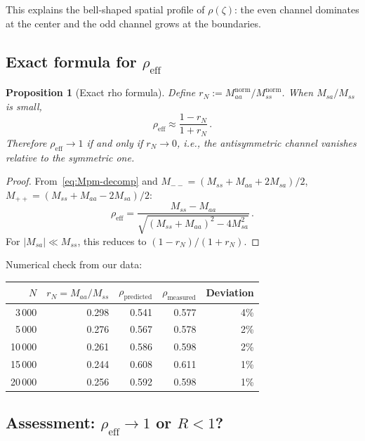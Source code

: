 \documentclass[11pt,a4paper]{article}
\newtheorem{proposition}{Proposition}
\begin{document}
This explains the bell-shaped spatial profile of $\rho(\zeta)$:
the even channel dominates at the center and the odd channel grows
at the boundaries.

\subsection{Exact formula for $\rho_{\mathrm{eff}}$}

\begin{proposition}[Exact rho formula]\label{prop:rho-exact}
Define $r_N := M_{aa}^{\mathrm{norm}} / M_{ss}^{\mathrm{norm}}$.
When $M_{sa}/M_{ss}$ is small,
\begin{equation}\label{eq:rho-exact}
  \rho_{\mathrm{eff}} \approx \frac{1 - r_N}{1 + r_N}\,.
\end{equation}
Therefore $\rho_{\mathrm{eff}} \to 1$ if and only if $r_N \to 0$,
i.e., the antisymmetric channel vanishes relative to the symmetric one.
\end{proposition}

\begin{proof}
From~\eqref{eq:Mpm-decomp} and $M_{--} = (M_{ss} + M_{aa} + 2M_{sa})/2$,
$M_{++} = (M_{ss} + M_{aa} - 2M_{sa})/2$:
\[
  \rho_{\mathrm{eff}}
  = \frac{M_{ss} - M_{aa}}
  {\sqrt{(M_{ss}+M_{aa})^2 - 4M_{sa}^2}}\,.
\]
For $|M_{sa}| \ll M_{ss}$, this reduces to $(1-r_N)/(1+r_N)$.
\end{proof}

Numerical check from our data:
\begin{center}
\begin{tabular}{rrrrr}
\toprule
$N$ & $r_N = M_{aa}/M_{ss}$ & $\rho_{\text{predicted}}$ & $\rho_{\text{measured}}$ & Deviation \\
\midrule
3\,000  & 0.298 & 0.541 & 0.577 & 4\% \\
5\,000  & 0.276 & 0.567 & 0.578 & 2\% \\
10\,000 & 0.261 & 0.586 & 0.598 & 2\% \\
15\,000 & 0.244 & 0.608 & 0.611 & 1\% \\
20\,000 & 0.256 & 0.592 & 0.598 & 1\% \\
\bottomrule
\end{tabular}
\end{center}

\subsection{Assessment: $\rho_{\mathrm{eff}} \to 1$ or $R < 1$?}
\end{document}
